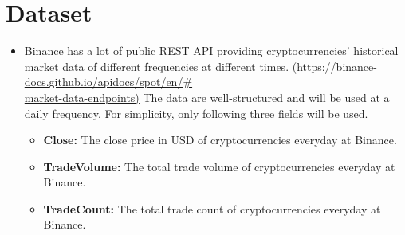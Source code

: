 \documentclass[a4paper]{article}
\begin{document}
\section{Dataset}
\begin{itemize}
    \item Binance has a lot of public REST API providing cryptocurrencies' historical market data of different frequencies at different times. \href{https://binance-docs.github.io/apidocs/spot/en/#market-d\\ata-endpoints}{(https://binance-docs.github.io/apidocs/spot/en/\#\\market-data-endpoints)} The data are well-structured and will be used at a daily frequency. For simplicity, only following three fields will be used.
    \begin{itemize}
        \item \textbf{Close:} The close price in USD of cryptocurrencies everyday at Binance.
        \item \textbf{TradeVolume:} The total trade volume of cryptocurrencies everyday at Binance.
        \item \textbf{TradeCount:} The total trade count of cryptocurrencies everyday at Binance.
    \end{itemize}


\end{itemize}
\end{document}
